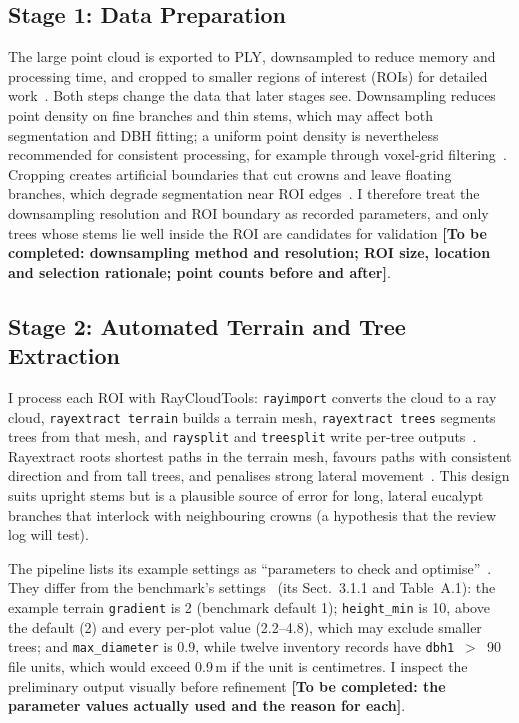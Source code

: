 \documentclass[runningheads]{llncs}
\newcommand{\todo}[1]{\textbf{[To be completed: #1]}}
\begin{document}
\subsection{Stage 1: Data Preparation}\label{sec:prep}
The large point cloud is exported to PLY, downsampled to reduce memory and processing time, and cropped to smaller regions of interest (ROIs) for detailed work~\cite{pipeline}. Both steps change the data that later stages see. Downsampling reduces point density on fine branches and thin stems, which may affect both segmentation and DBH fitting; a uniform point density is nevertheless recommended for consistent processing, for example through voxel-grid filtering~\cite{calders2020}. Cropping creates artificial boundaries that cut crowns and leave floating branches, which degrade segmentation near ROI edges~\cite{cherlet2026}. I therefore treat the downsampling resolution and ROI boundary as recorded parameters, and only trees whose stems lie well inside the ROI are candidates for validation \todo{downsampling method and resolution; ROI size, location and selection rationale; point counts before and after}.

\subsection{Stage 2: Automated Terrain and Tree Extraction}\label{sec:auto}
I process each ROI with RayCloudTools: \texttt{rayimport} converts the cloud to a ray cloud, \texttt{rayextract terrain} builds a terrain mesh, \texttt{rayextract trees} segments trees from that mesh, and \texttt{raysplit} and \texttt{treesplit} write per-tree outputs~\cite{pipeline}. Rayextract roots shortest paths in the terrain mesh, favours paths with consistent direction and from tall trees, and penalises strong lateral movement~\cite{cherlet2026}. This design suits upright stems but is a plausible source of error for long, lateral eucalypt branches that interlock with neighbouring crowns (a hypothesis that the review log will test).

The pipeline lists its example settings as ``parameters to check and optimise''~\cite{pipeline}. They differ from the benchmark's settings~\cite{cherlet2026} (its Sect.~3.1.1 and Table~A.1): the example terrain \texttt{gradient} is 2 (benchmark default 1); \texttt{height\_min} is 10, above the default (2) and every per-plot value (2.2--4.8), which may exclude smaller trees; and \texttt{max\_diameter} is 0.9, while twelve inventory records have \texttt{dbh1}~$>$~90 file units, which would exceed 0.9\,m if the unit is centimetres. I inspect the preliminary output visually before refinement \todo{the parameter values actually used and the reason for each}.
\end{document}
